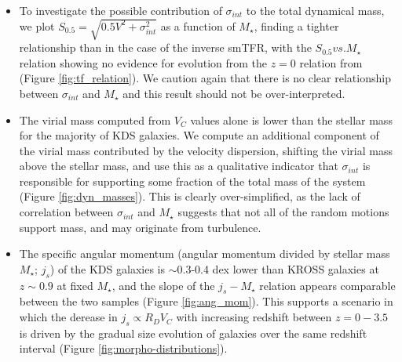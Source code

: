\documentclass[a4paper,fleqn,usenatbib]{mn2e}
\begin{document}
\begin{itemize}
    \item To investigate the possible contribution of $\sigma_{int}$ to the total dynamical mass, we plot $S_{0.5} = \sqrt{0.5V^{2} + \sigma_{int}^{2}}$ as a function of $M_{\star}$, finding a tighter relationship than in the case of the inverse smTFR, with the $S_{0.5} vs. M_{\star}$ relation showing no evidence for evolution from the $z=0$ relation from \cite{Kassin2007} (Figure \ref{fig:tf_relation}).
    We caution again that there is no clear relationship between $\sigma_{int}$ and $M_{\star}$ and this result should not be over-interpreted.
    \item The virial mass computed from $V_{C}$ values alone is lower than the stellar mass for the majority of KDS galaxies.
    We compute an additional component of the virial mass contributed by the velocity dispersion, shifting the virial mass above the stellar mass, and use this as a qualitative indicator that $\sigma_{int}$ is responsible for supporting some fraction of the total mass of the system (Figure \ref{fig:dyn_masses}).
    This is clearly over-simplified, as the lack of correlation between $\sigma_{int}$ and $M_{\star}$ suggests that not all of the random motions support mass, and may originate from turbulence.
    \item The specific angular momentum (angular momentum divided by stellar mass $M_{\star}$; $j_{s}$) of the KDS galaxies is $\sim$0.3-0.4 dex lower than KROSS galaxies at $z\sim0.9$ at fixed $M_{\star}$, and the slope of the $j_{s}-M_{\star}$ relation appears comparable between the two samples (Figure \ref{fig:ang_mom}).
    This supports a scenario in which the derease in $j_{s} \propto R_{D}V_{C}$ with increasing redshift between $z=0-3.5$ is driven by the gradual size evolution of galaxies over the same redshift interval (Figure \ref{fig:morpho-distributions}).

\end{itemize}


\clearpage 

%

\clearpage



\appendix

\bsp    %
\label{lastpage}
\end{document}
